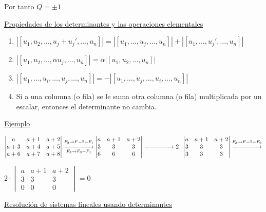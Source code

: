 \documentclass[12pt]{article}
\begin{document}
Por tanto $Q=\pm1$

\hspace{1cm}\underline{Propiedades de los determinantes y las
operaciones elementales}

\begin{enumerate}[label=\arabic*), leftmargin=*]
\item
$\left|\left[u_1,u_2,\hdots,u_j+u_j',\hdots,u_n\right]\right|=\left|\left[u_1,\hdots,u_j,\hdots,u_n\right]\right|+\left|\left[u_1,\hdots,u_j',\hdots,u_n\right]\right|$
\item $\left|\left[u_1,u_2,\hdots,\alpha
u_j,\hdots,u_n\right]\right|=\alpha\left|\left[u_1,u_2,\hdots,u_n\right]\right|$
\item $\left|\left[u_1,\hdots,u_i,\hdots,u_j,\hdots,
u_n\right]\right|=-\left|\left[u_1,\hdots,u_j,\hdots,u_i,\hdots,
u_n\right]\right|$
\item Si a una columna (o fila) se le suma otra columna (o fila)
multiplicada por un escalar, entonces el determinante no cambia.
\end{enumerate}

\underline{Ejemplo}

$\begin{vmatrix}
a & a+1 & a+2 \\ 
a+3 & a+4 & a+5 \\ 
a+6 & a+7 & a+8
\end{vmatrix} \overset{F_2\rightarrow
F-2-F_1}{\underset{F_3\rightarrow
F_3-F_1}{\xrightarrow{\hspace{1.5cm}}}}\begin{vmatrix}
a & a+1 & a+2 \\ 
3 & 3 & 3 \\ 
6 & 6 & 6
\end{vmatrix}\xrightarrow{\hspace{1.5cm}}2\cdot\begin{vmatrix}
a & a+1 & a+2 \\ 
3 & 3 & 3 \\ 
3 & 3 & 3
\end{vmatrix}\overset{F_3\rightarrow
F-2-F_2}{\xrightarrow{\hspace{1.5cm}}}$

$2\cdot\begin{vmatrix}
a & a+1 & a+2 \\ 
3 & 3 & 3 \\ 
0 & 0 & 0
\end{vmatrix}=0$

\hspace{1cm}\underline{Resolución de sistemas lineales usando
determinantes}
\end{document}
